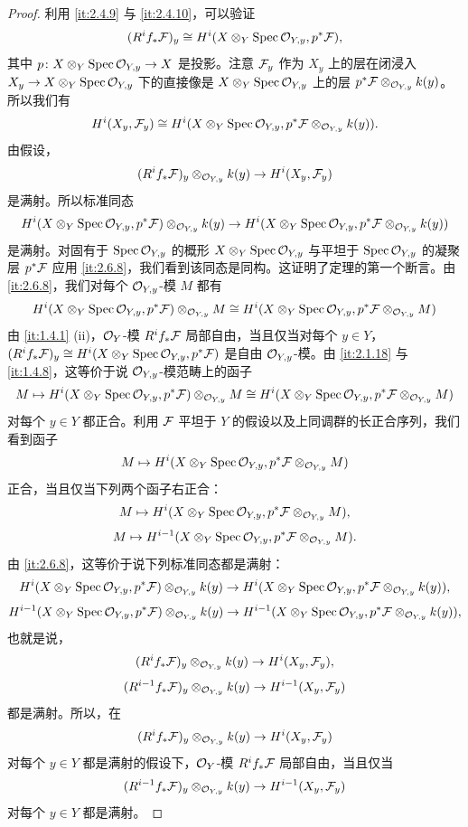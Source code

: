 \begin{proof}
利用 \ref{it:2.4.9} 与 \ref{it:2.4.10}，可以验证
\[
(R^if_*\mathcal{F})_y\cong H^i(X\otimes_Y\operatorname{Spec}\mathcal{O}_{Y,y},p^*\mathcal{F}),
\]
其中 $p\colon X\otimes_Y\operatorname{Spec}\mathcal{O}_{Y,y}\to X$ 是投影。注意 $\mathcal{F}_y$ 作为 $X_y$ 上的层在闭浸入 $X_y\to X\otimes_Y\operatorname{Spec}\mathcal{O}_{Y,y}$ 下的直接像是 $X\otimes_Y\operatorname{Spec}\mathcal{O}_{Y,y}$ 上的层 $p^*\mathcal{F}\otimes_{\mathcal{O}_{Y,y}}k(y)$。所以我们有
\[
H^i(X_y,\mathcal{F}_y)\cong H^i(X\otimes_Y\operatorname{Spec}\mathcal{O}_{Y,y},p^*\mathcal{F}\otimes_{\mathcal{O}_{Y,y}}k(y)).
\]
由假设，
\[
(R^if_*\mathcal{F})_y\otimes_{\mathcal{O}_{Y,y}}k(y)\to H^i(X_y,\mathcal{F}_y)
\]
是满射。所以标准同态
\[
H^i(X\otimes_Y\operatorname{Spec}\mathcal{O}_{Y,y},p^*\mathcal{F})\otimes_{\mathcal{O}_{Y,y}}k(y)\to H^i(X\otimes_Y\operatorname{Spec}\mathcal{O}_{Y,y},p^*\mathcal{F}\otimes_{\mathcal{O}_{Y,y}}k(y))
\]
是满射。对固有于 $\operatorname{Spec}\mathcal{O}_{Y,y}$ 的概形 $X\otimes_Y\operatorname{Spec}\mathcal{O}_{Y,y}$ 与平坦于 $\operatorname{Spec}\mathcal{O}_{Y,y}$ 的凝聚层 $p^*\mathcal{F}$ 应用 \ref{it:2.6.8}，我们看到该同态是同构。这证明了定理的第一个断言。由 \ref{it:2.6.8}，我们对每个 $\mathcal{O}_{Y,y}$-模 $M$ 都有
\[
H^i(X\otimes_Y\operatorname{Spec}\mathcal{O}_{Y,y},p^*\mathcal{F})\otimes_{\mathcal{O}_{Y,y}}M\cong H^i(X\otimes_Y\operatorname{Spec}\mathcal{O}_{Y,y},p^*\mathcal{F}\otimes_{\mathcal{O}_{Y,y}}M)
\]
由 \ref{it:1.4.1} (ii)，$\mathcal{O}_Y$-模 $R^if_*\mathcal{F}$ 局部自由，当且仅当对每个 $y\in Y$，$(R^if_*\mathcal{F})_y\cong H^i(X\otimes_Y\operatorname{Spec}\mathcal{O}_{Y,y},p^*\mathcal{F})$ 是自由 $\mathcal{O}_{Y,y}$-模。由 \ref{it:2.1.18} 与 \ref{it:1.4.8}，这等价于说 $\mathcal{O}_{Y,y}$-模范畴上的函子
\[
M\mapsto H^i(X\otimes_Y\operatorname{Spec}\mathcal{O}_{Y,y},p^*\mathcal{F})\otimes_{\mathcal{O}_{Y,y}}M\cong H^i(X\otimes_Y\operatorname{Spec}\mathcal{O}_{Y,y},p^*\mathcal{F}\otimes_{\mathcal{O}_{Y,y}}M)
\]
对每个 $y\in Y$ 都正合。利用 $\mathcal{F}$ 平坦于 $Y$ 的假设以及上同调群的长正合序列，我们看到函子
\[
M\mapsto H^i(X\otimes_Y\operatorname{Spec}\mathcal{O}_{Y,y},p^*\mathcal{F}\otimes_{\mathcal{O}_{Y,y}}M)
\]
正合，当且仅当下列两个函子右正合：
\[
M\mapsto H^i(X\otimes_Y\operatorname{Spec}\mathcal{O}_{Y,y},p^*\mathcal{F}\otimes_{\mathcal{O}_{Y,y}}M),
\]
\[
M\mapsto H^{i-1}(X\otimes_Y\operatorname{Spec}\mathcal{O}_{Y,y},p^*\mathcal{F}\otimes_{\mathcal{O}_{Y,y}}M).
\]
由 \ref{it:2.6.8}，这等价于说下列标准同态都是满射：
\[
H^i(X\otimes_Y\operatorname{Spec}\mathcal{O}_{Y,y},p^*\mathcal{F})\otimes_{\mathcal{O}_{Y,y}}k(y)\to H^i(X\otimes_Y\operatorname{Spec}\mathcal{O}_{Y,y},p^*\mathcal{F}\otimes_{\mathcal{O}_{Y,y}}k(y)),
\]
\[
H^{i-1}(X\otimes_Y\operatorname{Spec}\mathcal{O}_{Y,y},p^*\mathcal{F})\otimes_{\mathcal{O}_{Y,y}}k(y)\to H^{i-1}(X\otimes_Y\operatorname{Spec}\mathcal{O}_{Y,y},p^*\mathcal{F}\otimes_{\mathcal{O}_{Y,y}}k(y)),
\]
也就是说，
\[
(R^if_*\mathcal{F})_y\otimes_{\mathcal{O}_{Y,y}}k(y)\to H^i(X_y,\mathcal{F}_y),
\]
\[
(R^{i-1}f_*\mathcal{F})_y\otimes_{\mathcal{O}_{Y,y}}k(y)\to H^{i-1}(X_y,\mathcal{F}_y)
\]
都是满射。所以，在
\[
(R^if_*\mathcal{F})_y\otimes_{\mathcal{O}_{Y,y}}k(y)\to H^i(X_y,\mathcal{F}_y)
\]
对每个 $y\in Y$ 都是满射的假设下，$\mathcal{O}_Y$-模 $R^if_*\mathcal{F}$ 局部自由，当且仅当
\[
(R^{i-1}f_*\mathcal{F})_y\otimes_{\mathcal{O}_{Y,y}}k(y)\to H^{i-1}(X_y,\mathcal{F}_y)
\]
对每个 $y\in Y$ 都是满射。
\end{proof}

